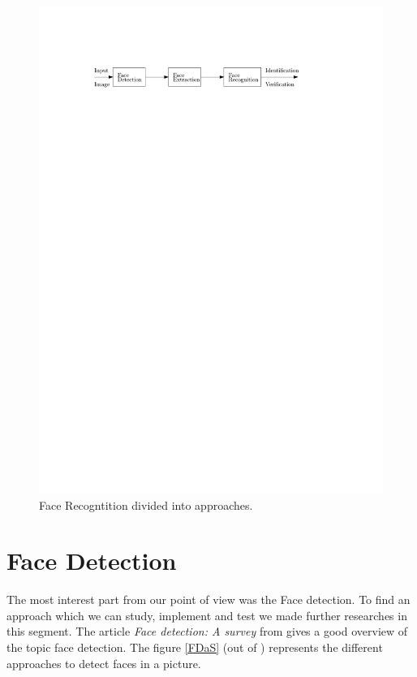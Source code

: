 \documentclass[Bachelorarbeit.tex]{subfiles}
\begin{document}
\begin{figure}[!h] %
\centering
\includegraphics[page=4,scale=1]{./pictures/drawings}
\caption{Face Recogntition divided into approaches. \label{FRa}}
\end{figure}

\section{Face Detection}
The most interest part from our point of view was the Face detection. To find an approach which we can study, implement and test we made further researches in this segment. The article \textit{Face detection: A survey} from \cite{FDASurvey} gives a good overview of the topic face detection. The figure \ref{FDaS} (out of \cite{FDASurvey}) represents the different approaches to detect faces in a picture.\\
\end{document}
